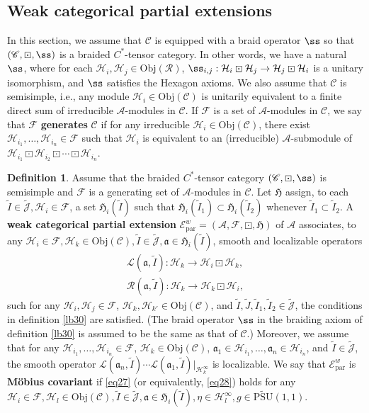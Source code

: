 \documentclass[11pt,b5paper,notitlepage]{article}
\theoremstyle{definition}
\newtheorem{df}{Definition}[subsection]
\theoremstyle{plain}
\newcommand{\fk}{\mathfrak}
\newcommand{\mc}{\mathcal}
\newcommand{\wtd}{\widetilde}
\newcommand{\loc}{\mathrm{par}}
\newcommand{\UPSU}{\widetilde{\mathrm{PSU}}(1,1)}
\newcommand{\scr}{\mathscr}
\newcommand{\Jtd}{\widetilde{\mathcal J}}
\newcommand{\Obj}{\mathrm{Obj}}
\numberwithin{equation}{subsection}
\begin{document}
\subsection{Weak categorical partial extensions}\label{lb49}

In this section, we assume that $\scr C$ is equipped with a braid operator $\ss$ so that $(\scr C,\boxdot,\ss)$ is a braided $C^*$-tensor category. In other words, we have a natural $\ss$, where for each $\mc H_i,\mc H_j\in\Obj(\scr R)$, $\ss_{i,j}:\mc H_i\boxdot\mc H_j\rightarrow\mc H_j\boxdot\mc H_i$ is a unitary isomorphism, and $\ss$ satisfies the Hexagon axioms.  We also assume that $\scr C$  is semisimple, i.e., any module $\mc H_i\in\Obj(\scr C)$ is unitarily equivalent to a finite direct sum of irreducible $\mc A$-modules in $\scr C$. If $\mc F$ is a set of  $\mc A$-modules in $\scr C$, we say that $\mc F$ \textbf{generates} $\scr C$ if for any irreducible $\mc H_i\in\Obj(\scr C)$, there exist $\mc H_{i_1},\dots,\mc H_{i_n}\in\mc F$ such that $\mc H_i$ is equivalent to an (irreducible) $\mc A$-submodule of $\mc H_{i_1}\boxdot\mc H_{i_2}\boxdot\cdots\boxdot\mc H_{i_n}$.

\begin{df}\label{lb31}
	Assume that the braided $C^*$-tensor category $(\scr C,\boxdot,\ss)$ is semisimple and $\mc F$ is a generating set of  $\mc A$-modules in $\scr C$. Let $\fk H$ assign, to each $\wtd I\in\Jtd,\mc H_i\in\mc F$, a set $\fk H_i(\wtd I)$ such that $\fk H_i(\wtd I_1)\subset\fk H_i(\wtd I_2)$ whenever $\wtd I_1\subset\wtd I_2$. A \textbf{weak categorical partial extension} $\scr E^w_\loc=(\mc A,\mc F,\boxdot,\fk H)$ of $\mc A$ associates, to any $\mc H_i\in\mc F,\mc H_k\in\Obj(\scr C),\wtd I\in\Jtd,\fk a\in\fk H_i(\wtd I)$, smooth and localizable operators
	\begin{gather*}	
	\mc L(\fk a,\wtd I):\mc H_k\rightarrow\mc H_i\boxdot\mc H_k,\\
	\mc R(\fk a,\wtd I):\mc H_k\rightarrow\mc H_k\boxdot\mc H_i,
	\end{gather*}
	such for any $\mc H_i,\mc H_j\in\mc F$, $\mc H_k,\mc H_{k'}\in\Obj(\scr C)$, and  $\wtd I,\wtd J,\wtd I_1,\wtd I_2\in\Jtd$, the conditions in definition \ref{lb30} are satisfied. (The braid operator $\ss$ in the braiding axiom of definition \ref{lb30} is assumed to be the same as that of $\scr C$.) Moreover, we assume that for any $\mc H_{i_1},\dots,\mc H_{i_n}\in\mc F$, $\mc H_k\in\Obj(\scr C)$, $\fk a_1\in\mc H_{i_1},\dots,\fk a_n\in\mc H_{i_n}$, and $\wtd I\in\Jtd$, the smooth operator $\mc L(\fk a_n,\wtd I)\cdots\mc L(\fk a_1,\wtd I)|_{\mc H_k^\infty}$ is localizable. We say that $\scr E^w_{\loc}$ is \textbf{M\"obius covariant} if \eqref{eq27} (or equivalently, \eqref{eq28}) holds for any $\mc H_i\in\mc F,\mc H_l\in\Obj(\scr C),\wtd I\in\Jtd,\fk a\in\fk H_i(\wtd I),\eta\in\mc H_l^\infty,g\in\UPSU$.
\end{df}
\end{document}
